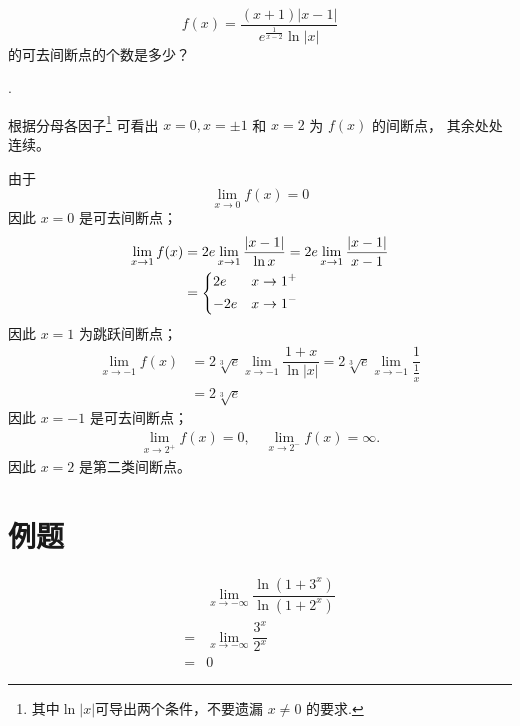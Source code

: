 \begin{example}
    \[
        f(x) = \dfrac{(x+1) | x-1 |}{e^{\frac{1}{x-2}} \ln |x|}
    \]
    的可去间断点的个数是多少？

    \cite[page 46, pdf 57, example 4]{we}.

    根据分母各因子\footnote{其中$\ln |x|$可导出两个条件，不要遗漏 $x \neq 0$ 的要求.}
    可看出 $x = 0, x = \pm 1$ 和 $x = 2$ 为 $f(x)$ 的间断点，
    其余处处连续。

    由于
    \[
        \lim_{x \to 0} f(x) = 0
    \]
    因此 $x = 0$ 是可去间断点；
    \begin{align*}
        \lim_{x \to 1} f(x) &= 2e \lim_{x\to 1} \dfrac{|x - 1|}{\ln x} = 2e \lim_{x\to 1} \dfrac{|x - 1|}{x - 1} \\
                            &= 
                            \begin{dcases}
                                2e & x \to 1^+ \\
                                -2e & x \to 1^-
                            \end{dcases}
    \end{align*}
    因此 $x = 1$ 为跳跃间断点；
    \begin{align*}
        \lim_{x \to -1} f(x) &= 2 \sqrt[3]{e} \lim_{x \to -1} \dfrac{1 + x}{\ln |x|} = 2 \sqrt[3]{e} \lim_{x \to -1} \dfrac{1}{\frac{1}{x}} \\
                             &= 2 \sqrt[3]{e}
    \end{align*}
    因此 $x = -1$ 是可去间断点；
    \begin{align*}
        \lim_{x \to 2^+} f(x) = 0, \quad \lim_{x \to 2^-} f(x) = \infty.
    \end{align*}
    因此 $x = 2$ 是第二类间断点。
\end{example}

\section{例题}

\begin{example}
    \begin{align*}
         &\lim_{x \to - \infty} \dfrac{\ln (1+ 3^x)}{\ln (1+ 2^x)} \\
        =&\lim_{x \to - \infty} \dfrac{3^x}{2^x} \\
        =&0
    \end{align*}
\end{example}

